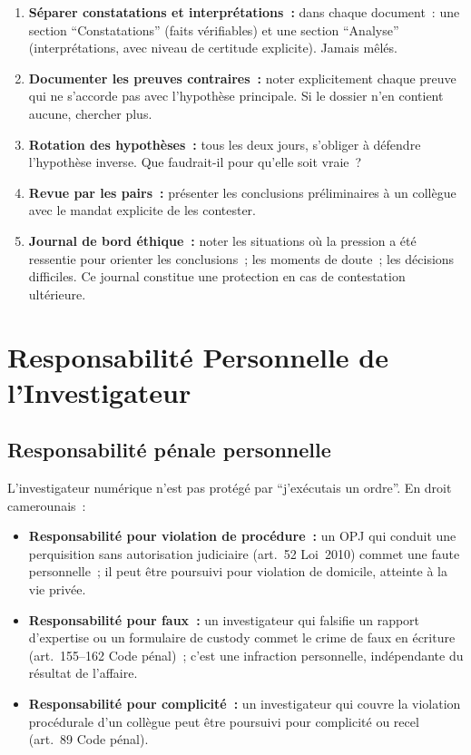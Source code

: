 \begin{enumerate}
    \item \textbf{Séparer constatations et interprétations~:}
          dans chaque document~: une section ``Constatations''
          (faits vérifiables) et une section ``Analyse''
          (interprétations, avec niveau de certitude explicite).
          Jamais mêlés.
    \item \textbf{Documenter les preuves contraires~:} noter explicitement
          chaque preuve qui ne s'accorde pas avec l'hypothèse principale.
          Si le dossier n'en contient aucune, chercher plus.
    \item \textbf{Rotation des hypothèses~:} tous les deux jours, s'obliger
          à défendre l'hypothèse inverse. Que faudrait-il pour qu'elle
          soit vraie~?
    \item \textbf{Revue par les pairs~:} présenter les conclusions
          préliminaires à un collègue avec le mandat explicite de
          les contester.
    \item \textbf{Journal de bord éthique~:} noter les situations
          où la pression a été ressentie pour orienter les conclusions~;
          les moments de doute~; les décisions difficiles. Ce journal
          constitue une protection en cas de contestation ultérieure.
\end{enumerate}

\section{Responsabilité Personnelle de l'Investigateur}
\label{sec:responsabilite}

\subsection{Responsabilité pénale personnelle}

L'investigateur numérique n'est pas protégé par ``j'exécutais un ordre''.
En droit camerounais~:

\begin{itemize}
    \item \textbf{Responsabilité pour violation de procédure~:}
          un OPJ qui conduit une perquisition sans autorisation judiciaire
          (art.~52 Loi~2010) commet une faute personnelle~; il peut être
          poursuivi pour violation de domicile, atteinte à la vie privée.
    \item \textbf{Responsabilité pour faux~:} un investigateur qui
          falsifie un rapport d'expertise ou un formulaire de custody
          commet le crime de faux en écriture (art.~155--162 Code pénal)~;
          c'est une infraction personnelle, indépendante du résultat
          de l'affaire.
    \item \textbf{Responsabilité pour complicité~:} un investigateur
          qui couvre la violation procédurale d'un collègue peut être
          poursuivi pour complicité ou recel (art.~89 Code pénal).
\end{itemize}

